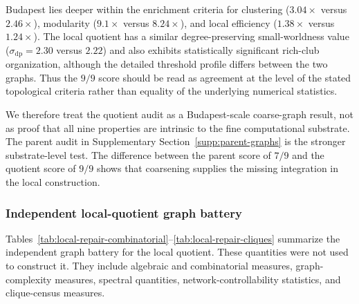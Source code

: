\documentclass[12pt]{article}
\begin{document}
Budapest lies deeper within the enrichment criteria for clustering
(\(3.04\times\) versus \(2.46\times\)), modularity (\(9.1\times\) versus
\(8.24\times\)), and local efficiency (\(1.38\times\) versus
\(1.24\times\)).  The local quotient has a similar degree-preserving
small-worldness value (\(\sigma_{\mathrm{dp}}=2.30\) versus \(2.22\)) and
also exhibits statistically significant rich-club organization, although
the detailed threshold profile differs between the two graphs.  Thus the
\(9/9\) score should be read as agreement at the level of the stated
topological criteria rather than equality of the underlying numerical
statistics.

We therefore treat the quotient audit as a Budapest-scale coarse-graph
result, not as proof that all nine properties are intrinsic to the fine
computational substrate.  The parent audit in
Supplementary Section~\ref{supp:parent-graphs} is the stronger substrate-level test.
The difference between the parent score of \(7/9\) and the quotient score of
\(9/9\) shows that coarsening supplies the missing integration in the local
construction.


\subsubsection{Independent local-quotient graph battery}

Tables~\ref{tab:local-repair-combinatorial}--\ref{tab:local-repair-cliques}
summarize the independent graph battery for the local quotient.  These
quantities were not used to construct it.  They include algebraic and
combinatorial measures, graph-complexity measures, spectral quantities,
network-controllability statistics, and clique-census measures.
\end{document}
